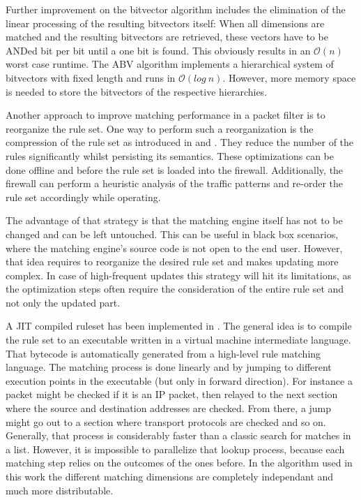 \documentclass[a4paper,
		12pt,
		parskip=full,
		titlepage
		]{scrartcl}
\begin{document}
Further improvement on the bitvector algorithm includes the elimination of the linear processing of the resulting bitvectors itself:
When all dimensions are matched and the resulting bitvectors are retrieved, these vectors have to be ANDed bit per bit until a one bit is found.
This obviously results in an $\mathcal O(n)$ worst case runtime.
The ABV algorithm \cite{abv} implements a hierarchical system of bitvectors with fixed length and runs in $\mathcal O(log\ n)$.
However, more memory space is needed to store the bitvectors of the respective hierarchies.

Another approach to improve matching performance in a packet filter is to reorganize the rule set.
One way to perform such a reorganization is the compression of the rule set as introduced in \cite{firewall_compressor} and \cite{redundancy_removal}.
They reduce the number of the rules significantly whilst persisting its semantics.
These optimizations can be done offline and before the rule set is loaded into the firewall.
Additionally, the firewall can perform a heuristic analysis of the traffic patterns and re-order the rule set accordingly while operating.

The advantage of that strategy is that the matching engine itself has not to be changed and can be left untouched.
This can be useful in black box scenarios, where the matching engine's source code is not open to the end user.
However, that idea requires to reorganize the desired rule set and makes updating more complex.
In case of high-frequent updates this strategy will hit its limitations, 
as the optimization steps often require the consideration of the entire rule set and not only the updated part.

A JIT compiled ruleset has been implemented in \cite{bpfplus}.
The general idea is to compile the rule set to an executable written in a virtual machine intermediate language.
That bytecode is automatically generated from a high-level rule matching language.
The matching process is done linearly and by jumping to different execution points in the executable (but only in forward direction).
For instance a packet might be checked if it is an IP packet, then relayed to the next section where the source and destination addresses are checked.
From there, a jump might go out to a section where transport protocols are checked and so on.
Generally, that process is considerably faster than a classic search for matches in a list.
However, it is impossible to parallelize that lookup process, because each matching step relies on the outcomes of the ones before.
In the algorithm used in this work the different matching dimensions are 
completely independant and much more distributable.
\end{document}
